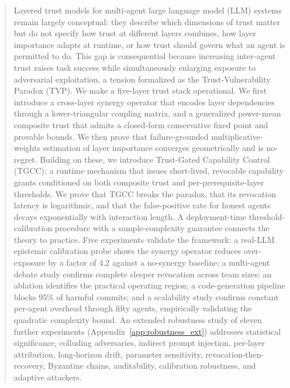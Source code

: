 \documentclass[sigconf,anonymous]{acmart}
\theoremstyle{plain}
\theoremstyle{definition}
\theoremstyle{remark}
\begin{document}
\begin{abstract}
Layered trust models for multi-agent large language model (LLM) systems remain largely
conceptual: they describe which dimensions of trust matter but do not specify how trust
at different layers combines, how layer importance adapts at runtime, or how trust should
govern what an agent is permitted to do. This gap is consequential because increasing
inter-agent trust raises task success while simultaneously enlarging exposure to
adversarial exploitation, a tension formalized as the Trust-Vulnerability Paradox (TVP).
We make a five-layer trust stack operational. We first introduce a cross-layer synergy
operator that encodes layer dependencies through a lower-triangular coupling matrix, and
a generalized power-mean composite trust that admits a closed-form conservative fixed
point and provable bounds. We then prove that failure-grounded multiplicative-weights
estimation of layer importance converges geometrically and is no-regret. Building on
these, we introduce Trust-Gated Capability Control (TGCC): a runtime mechanism that
issues short-lived, revocable capability grants conditioned on both composite trust and
per-prerequisite-layer thresholds. We prove that TGCC breaks the paradox, that its
revocation latency is logarithmic, and that the false-positive rate for honest agents
decays exponentially with interaction length. A deployment-time threshold-calibration
procedure with a sample-complexity guarantee connects the theory to practice. Five
experiments validate the framework: a real-LLM epistemic calibration probe shows the
synergy operator reduces over-exposure by a factor of $4.2$ against a no-synergy
baseline; a multi-agent debate study confirms complete sleeper revocation across team
sizes; an ablation identifies the practical operating region; a code-generation pipeline
blocks $95\%$ of harmful commits; and a scalability study confirms constant per-agent
overhead through fifty agents, empirically validating the quadratic complexity bound.
An extended robustness study of eleven further experiments (Appendix~\ref{app:robustness_ext})
addresses statistical significance, colluding adversaries, indirect prompt injection,
per-layer attribution, long-horizon drift, parameter sensitivity, revocation-then-recovery,
Byzantine chains, auditability, calibration robustness, and adaptive attackers.
\end{abstract}
\end{document}
